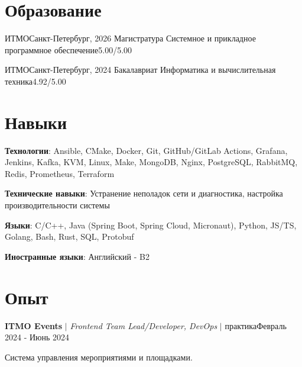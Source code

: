 \documentclass[letterpaper,11pt]{article}
\begin{document}
\section{Образование}
\resumeSubHeadingListStart
  \resumeSubheading
    {ИТМО}{Санкт-Петербург, 2026}
    {Магистратура Системное и прикладное программное обеспечение}{5.00/5.00}

  \resumeSubheading
    {ИТМО}{Санкт-Петербург, 2024}
    {Бакалавриат Информатика и вычислительная техника}{4.92/5.00}

\resumeSubHeadingListEnd

\section{Навыки}
\resumeSubHeadingListStart
  \small{\item{
    \textbf{Технологии}{: Ansible, CMake, Docker, Git, GitHub/GitLab Actions, Grafana, Jenkins, Kafka, KVM, Linux, Make, MongoDB, Nginx, PostgreSQL, RabbitMQ, Redis, Prometheus, Terraform }

    \textbf{Технические навыки}{: Устранение неполадок сети и диагностика, настройка производительности системы}

   \textbf{Языки}{: C/C++, Java (Spring Boot, Spring Cloud, Micronaut), Python, JS/TS, Golang, Bash, Rust, SQL, Protobuf }

   \textbf{Иностранные языки}{: Английский - B2}%
  }}
\resumeSubHeadingListEnd

\section{Опыт}
\resumeSubHeadingListStart
  \resumeExperienceHeading
    {\textbf{ITMO Events} $|$ \footnotesize\emph{Frontend Team Lead/Developer, DevOps} $|$ практика}{Февраль 2024 - Июнь 2024}

    {\vspace{-10pt}\small Система управления мероприятиями и площадками.\vspace{-7pt}}

  \resumeItemListStart
  \resumeItemListEnd
\end{document}
